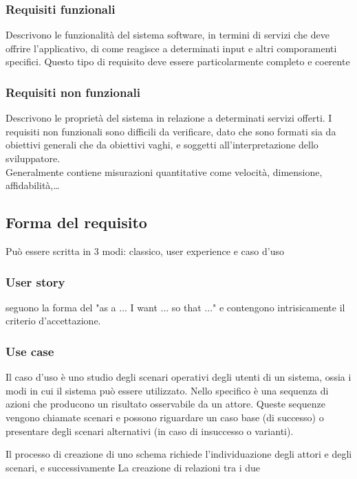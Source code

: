 \documentclass[12pt, a4paper]{article}
\begin{document}
\subsubsection*{Requisiti funzionali}
Descrivono le funzionalità del sistema software, in termini di servizi che deve offrire l'applicativo, di come reagisce 
a determinati input e altri comporamenti specifici. Questo tipo di requisito deve essere particolarmente completo e
coerente

\subsubsection*{Requisiti non funzionali}
Descrivono le proprietà del sistema in relazione a determinati servizi offerti. I requisiti non funzionali sono difficili 
da verificare, dato che sono formati sia da obiettivi generali che da obiettivi vaghi, e soggetti all'interpretazione 
dello sviluppatore.\\Generalmente contiene misurazioni quantitative come velocità, dimensione, affidabilità,\dots

\subsection{Forma del requisito}
Può essere scritta in 3 modi: classico, user experience e caso d'uso
\subsubsection*{User story}
seguono la forma del "as a ... I want ... so that ..." e contengono intrisicamente il criterio d'accettazione.
\subsubsection*{Use case}
Il caso d'uso è uno studio degli scenari operativi degli utenti di un sistema, ossia i modi in cui il sistema può essere 
utilizzato. Nello specifico è una sequenza di azioni che producono un risultato osservabile da un attore. Queste 
sequenze vengono chiamate scenari e possono riguardare un caso base (di successo) o presentare degli scenari alternativi
(in caso di insuccesso o varianti). 

Il processo di creazione di uno schema richiede l'individuazione degli attori e degli scenari, e successivamente La
creazione di relazioni tra i due
\end{document}
